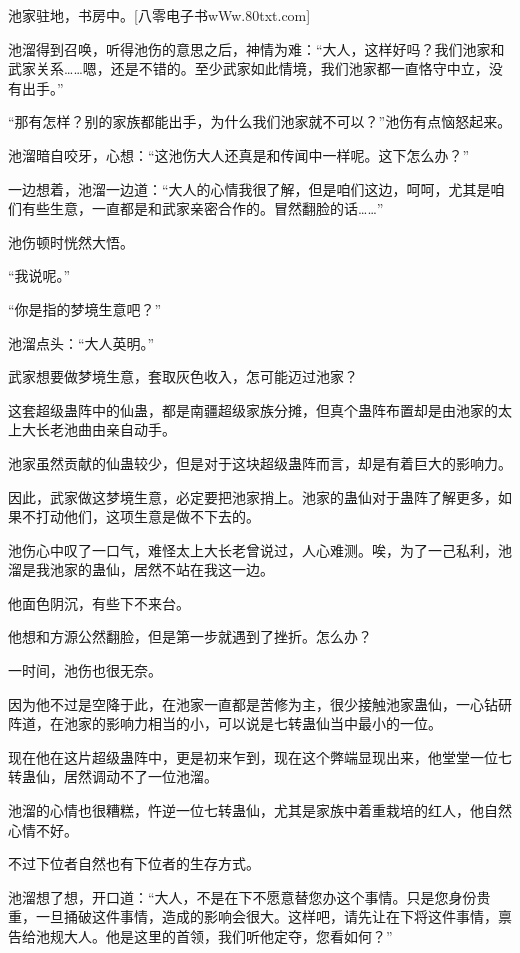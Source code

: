 
\begin{this_body}

池家驻地，书房中。[八零电子书wWw.80txt.com]

池溜得到召唤，听得池伤的意思之后，神情为难：“大人，这样好吗？我们池家和武家关系……嗯，还是不错的。至少武家如此情境，我们池家都一直恪守中立，没有出手。”

“那有怎样？别的家族都能出手，为什么我们池家就不可以？”池伤有点恼怒起来。

池溜暗自咬牙，心想：“这池伤大人还真是和传闻中一样呢。这下怎么办？”

一边想着，池溜一边道：“大人的心情我很了解，但是咱们这边，呵呵，尤其是咱们有些生意，一直都是和武家亲密合作的。冒然翻脸的话……”

池伤顿时恍然大悟。

“我说呢。”

“你是指的梦境生意吧？”

池溜点头：“大人英明。”

武家想要做梦境生意，套取灰色收入，怎可能迈过池家？

这套超级蛊阵中的仙蛊，都是南疆超级家族分摊，但真个蛊阵布置却是由池家的太上大长老池曲由亲自动手。

池家虽然贡献的仙蛊较少，但是对于这块超级蛊阵而言，却是有着巨大的影响力。

因此，武家做这梦境生意，必定要把池家捎上。池家的蛊仙对于蛊阵了解更多，如果不打动他们，这项生意是做不下去的。

池伤心中叹了一口气，难怪太上大长老曾说过，人心难测。唉，为了一己私利，池溜是我池家的蛊仙，居然不站在我这一边。

他面色阴沉，有些下不来台。

他想和方源公然翻脸，但是第一步就遇到了挫折。怎么办？

一时间，池伤也很无奈。

因为他不过是空降于此，在池家一直都是苦修为主，很少接触池家蛊仙，一心钻研阵道，在池家的影响力相当的小，可以说是七转蛊仙当中最小的一位。

现在他在这片超级蛊阵中，更是初来乍到，现在这个弊端显现出来，他堂堂一位七转蛊仙，居然调动不了一位池溜。

池溜的心情也很糟糕，忤逆一位七转蛊仙，尤其是家族中着重栽培的红人，他自然心情不好。

不过下位者自然也有下位者的生存方式。

池溜想了想，开口道：“大人，不是在下不愿意替您办这个事情。只是您身份贵重，一旦捅破这件事情，造成的影响会很大。这样吧，请先让在下将这件事情，禀告给池规大人。他是这里的首领，我们听他定夺，您看如何？”


\end{this_body}
